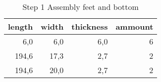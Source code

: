 \begin{table}[h!]
\centering
\caption{Step 1 Assembly feet and bottom}
\begin{tabular}{rrrr}
\toprule
 length &  width &  thickness &  ammount \\
\midrule
    6,0 &    6,0 &        6,0 &        6 \\
  194,6 &   17,3 &        2,7 &        2 \\
  194,6 &   20,0 &        2,7 &        2 \\
\bottomrule
\end{tabular}
\end{table}
